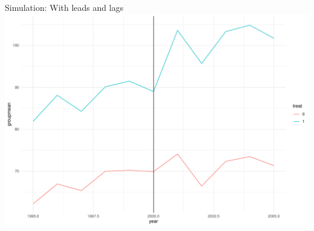 \documentclass[
  ignorenonframetext,
]{beamer}
\begin{document}
\begin{frame}{Simulation: With leads and lags}
\protect\hypertarget{simulation-with-leads-and-lags-5}{}
\includegraphics{Slides_DID_files/figure-beamer/didplot_fig-1.pdf}
\end{frame}
\end{document}
